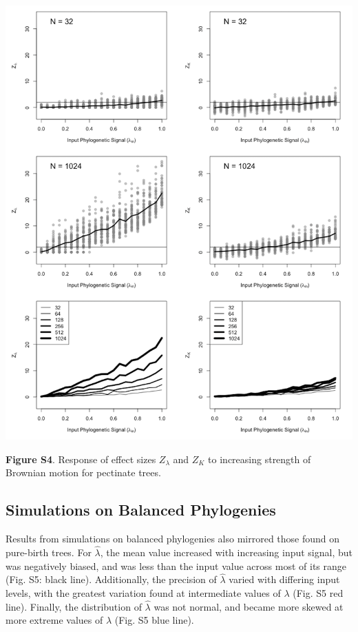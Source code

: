 \documentclass[
]{article}
\begin{document}
\includegraphics[width=0.95\linewidth]{fig.S4}

\textbf{Figure S4}. Response of effect sizes \(Z_{\lambda}\) and \(Z_K\)
to increasing strength of Brownian motion for pectinate trees.

\newpage

\hypertarget{simulations-on-balanced-phylogenies}{%
\subsection{Simulations on Balanced
Phylogenies}\label{simulations-on-balanced-phylogenies}}

Results from simulations on balanced phylogenies also mirrored those
found on pure-birth trees. For \(\hat{\lambda}\), the mean value
increased with increasing input signal, but was negatively biased, and
was less than the input value across most of its range (Fig. S5: black
line). Additionally, the precision of \(\hat{\lambda}\) varied with
differing input levels, with the greatest variation found at
intermediate values of \(\lambda\) (Fig. S5 red line). Finally, the
distribution of \(\hat{\lambda}\) was not normal, and became more skewed
at more extreme values of \(\lambda\) (Fig. S5 blue line). \hfill\break
\end{document}
